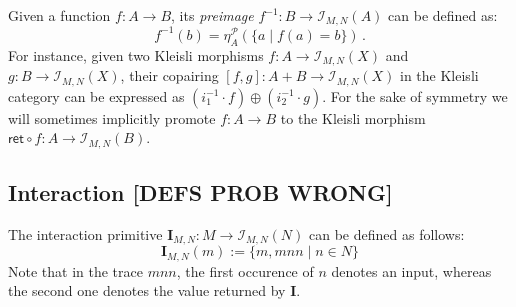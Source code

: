 \documentclass[acmsmall,timestamp,review,anonymous]{acmart}
\newcommand{\kw}[1]{\ensuremath{ \mathsf{#1} }}
\newcommand{\bind}{\gg\!\!=}
\begin{document}
Given a function $f : A \rightarrow B$,
its \emph{preimage}
$f^{-1} : B \rightarrow \mathcal{I}_{M,N}(A)$
can be defined as:
\[
    f^{-1}(b) = \eta^\mathcal{P}_A(\{ a \mid f(a) = b \}) \,.
\]
For instance, given two Kleisli morphisms
$f : A \rightarrow \mathcal{I}_{M,N}(X)$ and
$g : B \rightarrow \mathcal{I}_{M,N}(X)$,
their copairing $[f, g] : A + B \rightarrow \mathcal{I}_{M,N}(X)$
in the Kleisli category can be expressed as
$(i_1^{-1} \cdot f) \oplus (i_2^{-1} \cdot g)$.
For the sake of symmetry we will sometimes implicitly promote
$f : A \rightarrow B$ to the Kleisli morphism
$\kw{ret} \circ f : A \rightarrow \mathcal{I}_{M,N}(B)$.


\subsection{Interaction [DEFS PROB WRONG]} \label{sec:monad:int} %

The interaction primitive
$\mathbf{I}_{M,N} : M \rightarrow \mathcal{I}_{M,N}(N)$
can be defined as follows:
\[
    \mathbf{I}_{M,N}(m) := \{ m, mnn \mid n \in N \}
\]
Note that in the trace $mnn$,
the first occurence of $n$ denotes an input,
whereas the second one denotes the value returned by $\mathbf{I}$.

%
\end{document}
